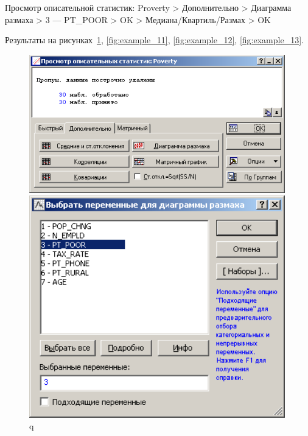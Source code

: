 Просмотр описательной статистик: Proverty
> Дополнительно > Диаграмма размаха > 3 — PT\_POOR > OK > Медиана/Квартиль/Размах > OK

Результаты на рисунках~\ref{fig:example_10}, \ref{fig:example_11}, \ref{fig:example_12}, \ref{fig:example_13}.

\begin{figure}[!h]
  \centering
  \begin{minipage}{0.32\textwidth}
    \centering

    \includegraphics[width=0.99\textwidth]
    {inc/example_10.PNG}

    \caption{q}
    \label{fig:example_10}
  \end{minipage}
  \begin{minipage}{0.32\textwidth}
    \centering

    \includegraphics[width=0.99\textwidth]
    {inc/example_11.PNG}


\end{minipage}
\end{figure}
